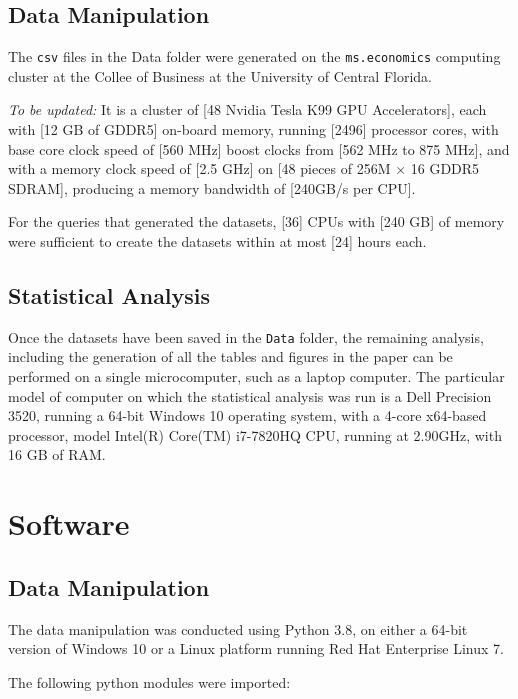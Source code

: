 \documentclass[11pt]{paper}
\begin{document}
\subsection*{Data Manipulation}

The \texttt{csv} files in the Data folder 
were generated on the 
\texttt{ms.economics} computing cluster
at the Collee of Business
at the University of Central Florida. 

\emph{To be updated:}
It is a cluster of
[48 Nvidia Tesla K99 GPU Accelerators],
each with [12 GB of GDDR5] on-board memory, 
running
[2496] processor cores, 
with base core clock speed of [560 MHz]
boost clocks from [562 MHz to 875 MHz], 
and with a memory clock speed of [2.5 GHz] on
[48 pieces of 256M × 16 GDDR5 SDRAM], 
producing a memory bandwidth of [240GB/s per CPU]. 

For the queries that generated the datasets, 
[36] CPUs with [240 GB] of memory were sufficient
to create the datasets within at most [24] hours each. 


\subsection*{Statistical Analysis}

Once the datasets have been saved in the \texttt{Data} folder, 
the remaining analysis, including the generation of all the tables
and figures in the paper can be performed on a single microcomputer, 
such as a laptop computer.
The particular model of computer 
on which the statistical analysis was run
is a 
Dell Precision 3520,
running a 64-bit Windows 10 operating system, 
with a 4-core x64-based processor,
model Intel(R) Core(TM) i7-7820HQ CPU, 
running at 2.90GHz, 
with 16 GB of RAM.


\section*{Software}

\subsection*{Data Manipulation}

The data manipulation was conducted using 
Python 3.8, 
on either a 64-bit version of Windows 10
or a Linux platform running
Red Hat Enterprise Linux 7. 


The following python modules were imported:
\end{document}
